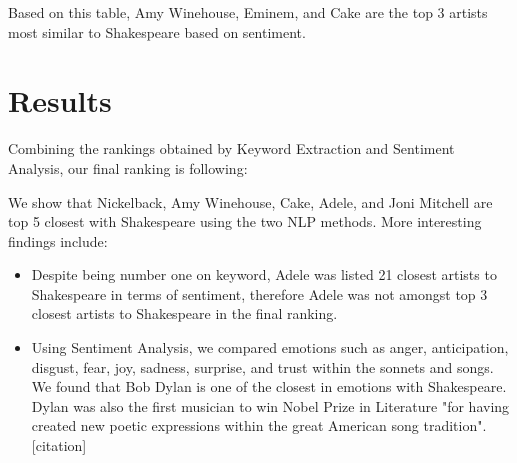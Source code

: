 \documentclass[10pt,a4paper]{article}
\begin{document}
Based on this table, Amy Winehouse, Eminem, and Cake are the top 3 artists most similar to Shakespeare based on sentiment.

\section{Results}

Combining the rankings obtained by Keyword Extraction and Sentiment Analysis, our final ranking is following:

\begin{table}[ht]
\centering
{}
\caption{Ranked Top 10 Most Similar Music Artist to Shakespeare} 
\label{tab:overallranktable}
\end{table}


We show that Nickelback, Amy Winehouse, Cake, Adele, and Joni Mitchell are top 5 closest with Shakespeare using the two NLP methods. More interesting findings include:

\begin{itemize}

\item Despite being number one on keyword, Adele was listed 21 closest artists to Shakespeare in terms of sentiment, therefore Adele was not amongst top 3 closest artists to Shakespeare in the final ranking.
\item Using Sentiment Analysis, we compared emotions such as anger, anticipation, disgust, fear, joy, sadness, surprise, and trust within the sonnets and songs. We found that Bob Dylan is one of the closest in emotions with Shakespeare. Dylan was also the first musician to win Nobel Prize in Literature "for having created new poetic expressions within the great American song tradition". [citation]

\end{itemize}
\end{document}
